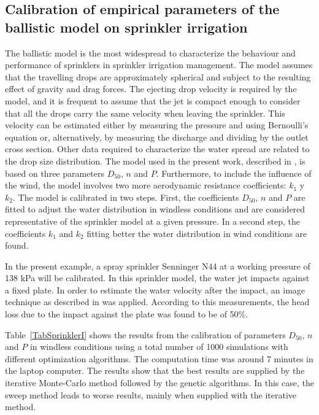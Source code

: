 \documentclass[review,authoryear]{elsarticle}
\begin{document}
\subsection{Calibration of empirical parameters of the ballistic model on
sprinkler irrigation}

The ballistic model \citep{Fukui80,Playan06} is the most widespread to characterize the behaviour and performance of sprinklers in sprinkler irrigation management. The model assumes that the travelling drops are approximately spherical and subject to the resulting effect of gravity and drag forces. The ejecting drop velocity is required by the model, and it is frequent to assume that the jet is compact enough to consider that all the drops carry the same velocity when leaving the sprinkler. This velocity can be estimated either by measuring the pressure and using Bernoulli's equation or, alternatively, by measuring the discharge and dividing by the outlet cross section. Other data required to characterize the water spread are related to the drop size distribution. The model used in the present work, described in \cite{Ouazaa14}, is based on three parameters $D_{50}$, $n$ and $P$. Furthermore, to include the influence of the wind, the model involves two more aerodynamic resistance coefficients:
$k_1$ y $k_2$.
The model is calibrated in two steps. First, the coefficients $D_{50}$, $n$ and $P$ are fitted to adjust the water distribution in windless conditions and are considered representative of the sprinkler model at a given pressure. In a second step, the coefficients $k_1$ and $k_2$ fitting better the water distribution in wind conditions are found.

In the present example, a spray sprinkler Senninger N44 at a working pressure of 138 kPa will be calibrated. In this sprinkler model, the water jet impacts against a fixed plate. In order to estimate the water velocity after the impact, an image technique as described in \citet{Salvador09} was applied. According to this measurements, the head loss due to the impact against the plate was found to be of 50\%.

Table~\ref{TabSprinklerI} shows the results from the calibration of parameters $D_{50}$, $n$ and $P$ in windless conditions using a total number of 1000 simulations with different optimization algorithms. The computation time was around 7 minutes in the laptop computer. The results show that the best results are supplied by the iterative Monte-Carlo method followed by the genetic algorithms. In this case, the sweep method leads to worse results, mainly when supplied with the iterative method. 
\end{document}
